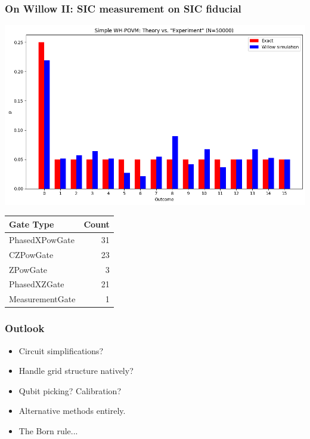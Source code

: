 \documentclass{beamer}
\begin{document}
\begin{frame}
\frametitle{On Willow II: SIC measurement on SIC fiducial}
\begin{center}
\includegraphics[scale=0.34]{img/willow_sim_simple_wh.png}
\end{center}	
\begin{tiny}
\begin{table}[h!]
\centering
\begin{tabular}{lr}
\toprule
\textbf{Gate Type} & \textbf{Count} \\
\midrule
PhasedXPowGate  & 31 \\
CZPowGate       & 23 \\
ZPowGate        & 3 \\
PhasedXZGate    & 21 \\
MeasurementGate & 1 \\
\bottomrule
\end{tabular}
\label{tab:circuit_gate_counts_2}
\end{table}
\end{tiny}
\end{frame}

\begin{frame}
\frametitle{Outlook}
\begin{itemize}
\item Circuit simplifications?
\item Handle grid structure natively?
\item Qubit picking? Calibration?
\item Alternative methods entirely.
\item The Born rule...
\end{itemize}
\end{frame}
\end{document}
